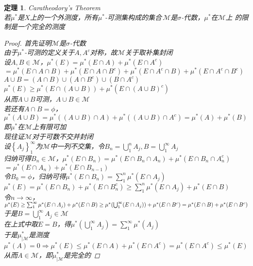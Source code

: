 \documentclass[12pt, a4paper, oneside]{ctexbook}
\newtheorem{theorem}{定理}[section]
\begin{document}
\begin{theorem}
    Caratheodory's Theorem\\
    若$\mu^*$是$X$上的一个外测度，所有$\mu^*$-可测集构成的集合$\,\mathcal{M}$是$\sigma$-代数，$\mu^*$在$\mathcal{M}$上
    的限制是一个完全的测度
    \begin{proof}
        首先证明$\mathcal{M}$是$\sigma$-代数\\
        由于$\mu^*$-可测的定义关于$A,A^c$对称，故$\mathcal{M}$关于取补集封闭\\
        设$A,B\in\mathcal{M}$，$\mu^*(E)=\mu^*(E\cap A)+\mu^*(E\cap A^c)$\\
        $=\mu^*(E\cap A\cap B)+\mu^*(E\cap A\cap B^c)+\mu^*(E\cap A^c\cap B)+\mu^*(E\cap A^c\cap B^c)$\\
        $A\cup B=(A\cap B)\cup(A\cap B^c)\cup(B\cap A^c)$\\
        $\mu^*(E)\geq\mu^*(E\cap(A\cup B))+\mu^*(E\cap(A\cup B)^c)$\\
        从而$A\cup B$可测，$A\cup B\in\mathcal{M}$\\
        若还有$A\cap B=\phi$，\\
        $\mu^*(A\cup B)=\mu^*((A\cup B)\cap A)+\mu^*((A\cup B)\cap A^c)=\mu^*(A)+\mu^*(B)$\\
        即$\mu^*$在$\mathcal{M}$上有限可加\\
        现往证$\mathcal{M}$对于可数不交并封闭\\
        设$\left\{A_j\right\}_1^{\infty}$为$\mathcal{M}$中一列不交集，令$B_n=\bigcup_1^nA_j,B=\bigcup_1^{\infty}A_j$\\
        归纳可得$B_n\in\mathcal{M}$，$\mu^*(E\cap B_n)=\mu^*(E\cap B_n\cap A_n)+\mu^*(E\cap B_n\cap A_n^c)$\\
        $=\mu^*(E\cap A_n)+\mu^*(E\cap B_{n-1})$\\
        令$B_0=\phi$，归纳可得$\mu^*(E\cap B_n)=\sum_1^n\mu^*(E\cap A_j)$\\
        $\mu^*(E)=\mu^*(E\cap B_n)+\mu^*(E\cap B_n^c)\geq\sum_1^n\mu^*(E\cap A_j)+\mu^*(E\cap B)$\\
        令$n\rightarrow\infty$，$\mu^*(E)\geq\sum_1^{\infty}\mu^*(E\cap A_j)+\mu^*(E\cap B)\\
        \geq\mu^*(\bigcup_1^{\infty}(E\cap A_j))+\mu^*(E\cap B^c)=\mu^*(E\cap B)+\mu^*(E\cap B^c)$\\
        于是$B=\bigcup_1^{\infty}A_j\in\mathcal{M}$\\
        在上式中取$E=B$，得$\mu^*(\bigcup_1^{\infty}A_j)=\sum_1^{\infty}\mu^*(A_j)$\\
        于是$\mu^*_{|\mathcal{M}}$是测度\\
        $\mu^*(A)=0\Rightarrow\mu^*(E)\leq\mu^*(E\cap A)+\mu^*(E\cap A^c)=\mu^*(E\cap A^c)\leq\mu^*(E)$\\
        从而$A\in\mathcal{M}$，即$\mu^*_{|\mathcal{M}}$是完全的
    \end{proof}
\end{theorem}
\end{document}
